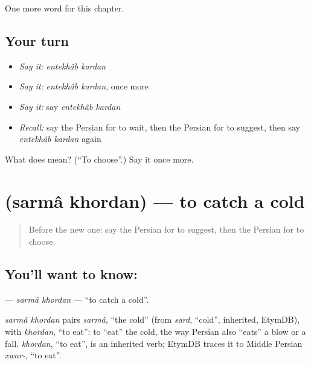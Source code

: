 \begin{grammarlens}[title={What you've built}]
One more word for this chapter.
\end{grammarlens}

\subsection*{Your turn}
\begin{itemize}
\raggedright
  \item \emph{Say it:} \emph{entekhâb kardan}
  \item \emph{Say it:} \emph{entekhâb kardan}, once more
  \item \emph{Say it:} say \emph{entekhâb kardan}
  \item \emph{Recall:} say the Persian for to wait, then the Persian for to suggest, then say \emph{entekhâb kardan} again
\end{itemize}

\begin{tcolorbox}[breakable,colback=teal!4,colframe=teal!35!black,title={Before you move on}]
What does   mean? (\textquotedblleft{}To choose\textquotedblright{}.) Say it once more.
\end{tcolorbox}
\section[\texorpdfstring{\fa{سرما} \fa{خوردن} (sarmâ khordan)}{سرما خوردن (sarmâ khordan)}]{  (sarmâ khordan) — to catch a cold}

\label{lesson:FA-C142-sarma-khordan}



\begin{quote}
Before the new one: say the Persian for to suggest, then the Persian for to choose.
\end{quote}

\subsection*{You'll want to know:  }
\textbf{ } — \emph{sarmâ khordan} — \textquotedblleft{}to catch a cold\textquotedblright{}.

\begin{cousinweb}
\emph{sarmâ khordan} pairs \emph{sarmâ}, \textquotedblleft{}the cold\textquotedblright{} (from \emph{sard}, \textquotedblleft{}cold\textquotedblright{}, inherited, EtymDB), with \emph{khordan}, \textquotedblleft{}to eat\textquotedblright{}: to \textquotedblleft{}eat\textquotedblright{} the cold, the way Persian also \textquotedblleft{}eats\textquotedblright{} a blow or a fall. \emph{khordan}, \textquotedblleft{}to eat\textquotedblright{}, is an inherited verb; EtymDB traces it to Middle Persian \emph{xwar-}, \textquotedblleft{}to eat\textquotedblright{}.
\end{cousinweb}

